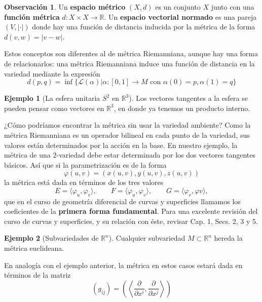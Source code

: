 \documentclass[spanish]{book}
\theoremstyle{definition}
\newtheorem*{obs}{Observación}
\newtheorem*{ejem}{Ejemplo}
\newcommand{\R}{\mathbb{R}}
\begin{document}
	\begin{obs}
		Un \textbf{espacio métrico} $(X,d)$ es un conjunto $X$ junto con una \textbf{función métrica} $d:X\times X\to\R$. Un \textbf{espacio vectorial normado} es una pareja $(V,|\cdot|)$ donde hay una función de distancia inducida por la métrica de la forma $d(v,w)=|v-w|$.
		
		Estos conceptos son diferentes al de métrica Riemanniana, aunque hay una forma de relacionarlos: una métrica Riemanniana induce una función de distancia en la variedad mediante la expresión
		\[d(p,q)=\inf\{\mathcal{L}(\alpha)|\alpha:[0,1]\to M\text{ con }\alpha(0)=p,\alpha(1)=q\}\]
	\end{obs}
	\begin{ejem}[La esfera unitaria $S^2$ en $\R^3$]
		Los vectores tangentes a la esfera se pueden pensar como vectores en $\R^3$, en donde ya tenemos un producto interno.
		
		¿Cómo podríamos encontrar la métrica sin usar la variedad ambiente? Como la métrica Riemanniana es un operador bilineal en cada punto de la variedad, sus valores están determinados por la acción en la base. En nuestro ejemplo, la métrica de una 2-variedad debe estar determinada por los dos vectores tangentes básicos. Así que si la parametrización es de la forma
		\[\varphi(u,v)=(x(u,v),y(u,v),z(u,v))\]
		la métrica está dada en términos de los tres valores
		\[E=\langle \varphi_u,\varphi_v\rangle,\qquad F=\langle \varphi_u,\varphi_v\rangle,\qquad G=\langle\varphi_v,\varphi v\rangle,\]
		que en el curso de geometría diferencial de curvas y superficies llamamos los coeficientes de la \textbf{primera forma fundamental}. Para una excelente revisión del curso de curvas y superficies, y su relación con éste, revisar \cite{Loring-dif} Cap. 1, Secs. 2, 3 y 5.
	\end{ejem}
	\begin{ejem}[Subvariedades de $\R^n$]
		Cualquier subvariedad $M\subset\R^n$ hereda la métrica euclideana.
		
		En analogía con el ejemplo anterior, la métrica en estos casos estará dada en términos de la matriz
		\[(g_{ij})=\left(\left\langle\frac{\partial}{\partial x^i},\frac{\partial}{\partial x^j}\right\rangle\right)\]
	\end{ejem}
\end{document}
